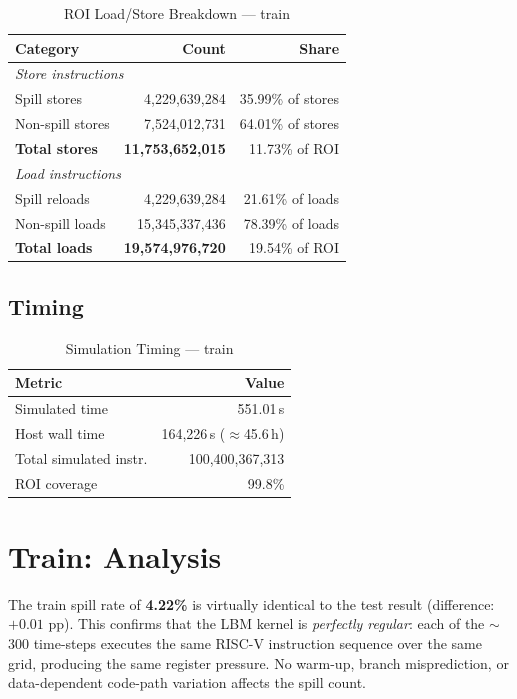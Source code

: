 \documentclass[conference]{IEEEtran}
\begin{document}
\begin{table}[H]
\centering
\caption{ROI Load/Store Breakdown --- train}
\label{tab:train_lsbreakdown}
\begin{tabular}{lrr}
\toprule
\textbf{Category} & \textbf{Count} & \textbf{Share} \\
\midrule
\multicolumn{3}{l}{\textit{Store instructions}} \\
\quad Spill stores     & 4,229,639,284 & 35.99\% of stores \\
\quad Non-spill stores & 7,524,012,731 & 64.01\% of stores \\
\quad \textbf{Total stores} & \textbf{11,753,652,015} & 11.73\% of ROI \\
\midrule
\multicolumn{3}{l}{\textit{Load instructions}} \\
\quad Spill reloads   & 4,229,639,284 & 21.61\% of loads \\
\quad Non-spill loads & 15,345,337,436 & 78.39\% of loads \\
\quad \textbf{Total loads} & \textbf{19,574,976,720} & 19.54\% of ROI \\
\bottomrule
\end{tabular}
\end{table}

\subsection{Timing}

\begin{table}[H]
\centering
\caption{Simulation Timing --- train}
\label{tab:train_timing}
\begin{tabular}{lr}
\toprule
\textbf{Metric} & \textbf{Value} \\
\midrule
Simulated time           & 551.01\,s \\
Host wall time           & 164,226\,s ($\approx$45.6\,h) \\
Total simulated instr.   & 100,400,367,313 \\
ROI coverage             & 99.8\% \\
\bottomrule
\end{tabular}
\end{table}

\section{Train: Analysis}

The train spill rate of \textbf{4.22\%} is virtually identical to the
test result (difference: $+0.01$ pp).  This confirms that the LBM
kernel is \emph{perfectly regular}: each of the $\sim$300 time-steps
executes the same RISC-V instruction sequence over the same grid,
producing the same register pressure.  No warm-up, branch
misprediction, or data-dependent code-path variation affects the
spill count.
\end{document}
